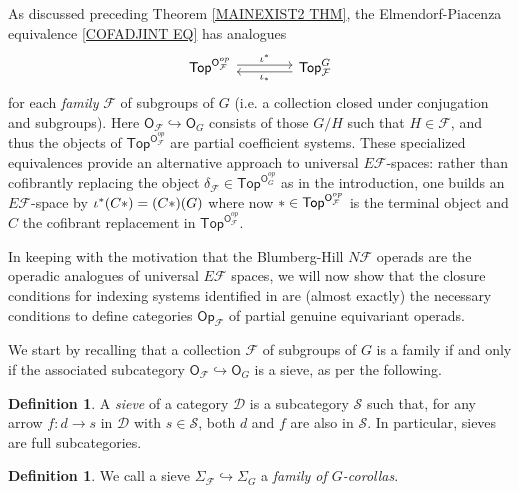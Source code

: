 \documentclass[a4paper,10pt
,draft
]{article}%
\numberwithin{equation}{section}
\numberwithin{figure}{section}
\theoremstyle{definition} %
\newtheorem{definition}[equation]{Definition}%
\newcommand{\1}{\ensuremath{\mathbbm 1}}%
\begin{document}
As discussed preceding Theorem \ref{MAINEXIST2 THM},
the Elmendorf-Piacenza equivalence
\eqref{COFADJINT EQ} has analogues
\[
\begin{tikzcd}[column sep =4em,row sep=0.3em]
	\mathsf{Top}^{\mathsf{O}_{\mathcal{F}}^{op}}
	\ar[shift left=1]{r}{\iota^{\**}} 
&
	\mathsf{Top}_{\mathcal{F}}^G
	\ar[shift left=1]{l}{\iota_{\**}}
\end{tikzcd}
\]
for each \textit{family} $\mathcal{F}$ of subgroups of $G$
(i.e. a collection closed under conjugation and subgroups).
Here $\mathsf{O}_\mathcal{F} \hookrightarrow \mathsf{O}_G$
consists of those $G/H$ such that $H \in \mathcal{F}$, 
and thus the objects of
$\mathsf{Top}^{\mathsf{O}_{\mathcal{F}}^{op}}$
are partial coefficient systems.
These specialized equivalences provide an alternative approach to universal 
$E \mathcal{F}$-spaces: rather than cofibrantly replacing the object
$\delta_{\mathcal{F}} \in \mathsf{Top}^{\mathsf{O}_G^{op}}$
as in the introduction,
one builds an $E \mathcal{F}$-space by
$\iota^{\**}(C \**) = (C *) (G)$
where now $\** \in \mathsf{Top}^{\mathsf{O}_{\mathcal{F}}^{op}}$
is the terminal object and $C$ the cofibrant replacement in $\mathsf{Top}^{\mathsf{O}_{\mathcal{F}}^{op}}$.

In keeping with the motivation that the Blumberg-Hill $N \mathcal{F}$ operads are the operadic analogues of universal $E \mathcal{F}$ spaces,
we will now show that the closure conditions for 
indexing systems
identified in \cite[Def. 3.22]{BH15}
are (almost exactly) the necessary conditions to define categories 
$\mathsf{Op}_{\mathcal{F}}$
of partial genuine equivariant operads.

We start by recalling that 
a collection $\mathcal F$ of subgroups of $G$
is a family %
if and only if the associated subcategory 
$\mathsf{O}_{\mathcal{F}} \hookrightarrow
\mathsf{O}_G$ is a sieve, as per the following.


\begin{definition}
	A \textit{sieve} of a category $\mathcal{D}$
	is a subcategory $\mathcal{S}$ such that,
	for any arrow $f \colon d \to s$ in $\mathcal{D}$ with 
	$s \in \mathcal{S}$,
	both $d$ and $f$ are also in $\mathcal{S}$. 
	In particular, sieves are full subcategories.
\end{definition}

\begin{definition}\label{FAMILY_COROLLAS_DEF}
      We call a sieve
      $\Sigma_{\mathcal{F}} \hookrightarrow \Sigma_G$
      a \textit{family of $G$-corollas}.
\end{definition}
\end{document}
